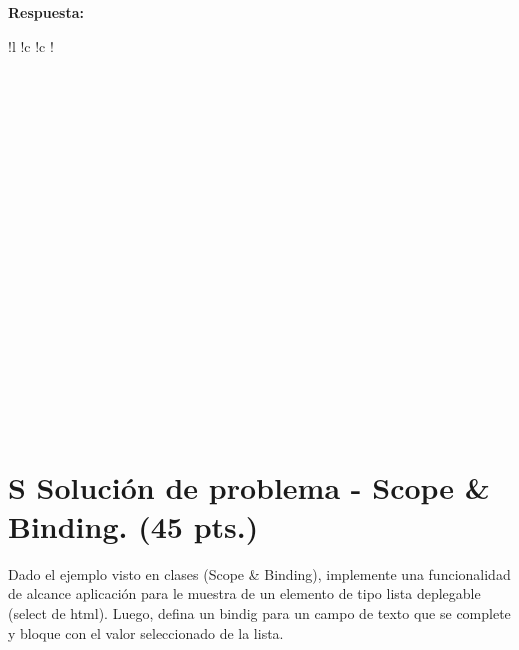 \documentclass{exam}
\begin{document}
\textbf{Respuesta:}

\begin{table}[H]
\begin{tabular}{
    !{\color{gray!50}\vrule}l
    !{\color{gray!50}\vrule}c
    !{\color{gray!50}\vrule}c
    !{\color{gray!50}\vrule}} 
     \hline
     \\
     \\ \\ \\ \\ \\ \\
    ~~~~~~~~~~~~~~~~~~~~~~~~~~~~~~~~~~~~~~~~~~~~~~~~~~~~~~~~~~~~~~~~~~~~~~~~~~~~~~~~~~~~~~~~~~~~~~~~~~~~~~~~~~~~~~~~~~~~~~~~~~~~~~~~~~~~~~~~~~
    \\ \\ \\ \\ \\ \\ \\ \\ \\ \\ \\ \\   \hline
\end{tabular}
\end{table}

\clearpage

\section{\textbf{S Soluci\'on de problema - Scope \& Binding. (45 pts.)}}

\noindent
Dado el ejemplo visto en clases (Scope \& Binding), implemente una funcionalidad de alcance aplicaci\'on para le muestra de un elemento de tipo lista deplegable (select de html). Luego, defina un bindig para un campo de texto que se complete y bloque con el valor seleccionado de la lista.
\end{document}
